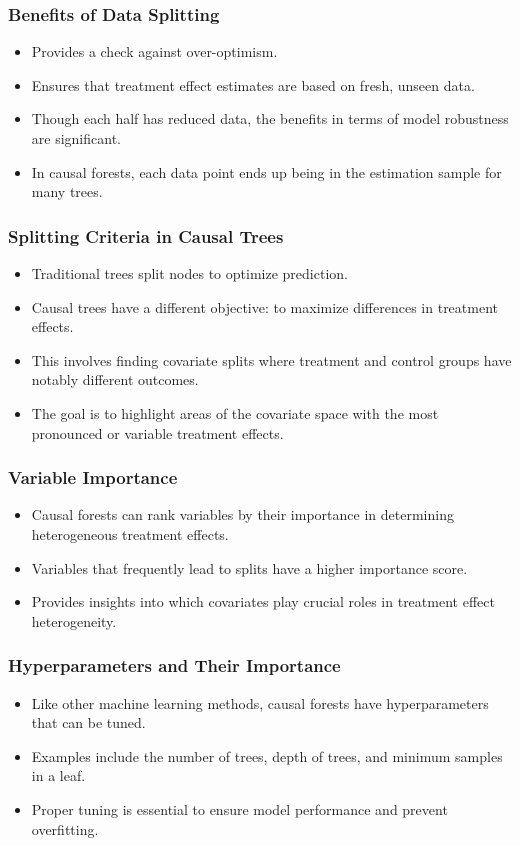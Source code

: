 \documentclass{beamer}
\begin{document}
\begin{frame}
\frametitle{Benefits of Data Splitting}
\begin{itemize}
\item Provides a check against over-optimism.
\item Ensures that treatment effect estimates are based on fresh, unseen data.
\item Though each half has reduced data, the benefits in terms of model robustness are significant.
\item In causal forests, each data point ends up being in the estimation sample for many trees.
\end{itemize}
\end{frame}


\begin{frame}
\frametitle{Splitting Criteria in Causal Trees}
\begin{itemize}
    \item Traditional trees split nodes to optimize prediction.
    \item Causal trees have a different objective: to maximize differences in treatment effects.
    \item This involves finding covariate splits where treatment and control groups have notably different outcomes.
    \item The goal is to highlight areas of the covariate space with the most pronounced or variable treatment effects.
\end{itemize}
\end{frame}



\begin{frame}
\frametitle{Variable Importance}
\begin{itemize}
    \item Causal forests can rank variables by their importance in determining heterogeneous treatment effects.
    \item Variables that frequently lead to splits have a higher importance score.
    \item Provides insights into which covariates play crucial roles in treatment effect heterogeneity.
\end{itemize}
\end{frame}


\begin{frame}
\frametitle{Hyperparameters and Their Importance}
\begin{itemize}
    \item Like other machine learning methods, causal forests have hyperparameters that can be tuned.
    \item Examples include the number of trees, depth of trees, and minimum samples in a leaf.
    \item Proper tuning is essential to ensure model performance and prevent overfitting.
\end{itemize}
\end{frame}
\end{document}
